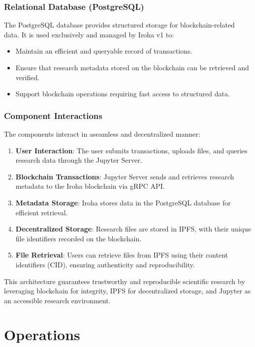 \documentclass[final]{rc-book-2.14}
\begin{document}
\subsubsection{Relational Database (PostgreSQL)}
The PostgreSQL database provides structured storage for blockchain-related data. It is used exclusively and managed by Iroha v1 to:
\begin{itemize}
    \item Maintain an efficient and queryable record of transactions.
    \item Ensure that research metadata stored on the blockchain can be retrieved and verified.
    \item Support blockchain operations requiring fast access to structured data.
\end{itemize}

\subsubsection{Component Interactions}
The components interact in aseamless and decentralized manner:
\begin{enumerate}
    \item \textbf{User Interaction}: The user submits transactions, uploads files, and queries research data through the Jupyter Server.
    \item \textbf{Blockchain Transactions}: Jupyter Server sends and retrieves research metadata to the Iroha blockchain via gRPC API.
    \item \textbf{Metadata Storage}: Iroha stores data in the PostgreSQL database for efficient retrieval.
    \item \textbf{Decentralized Storage}: Research files are stored in IPFS, with their unique file identifiers recorded on the blockchain.
    \item \textbf{File Retrieval}: Users can retrieve files from IPFS using their content identifiers (CID), ensuring authenticity and reproducibility.
\end{enumerate}

This architecture guarantees trustworthy and reproducible scientific research by leveraging blockchain for integrity, IPFS for decentralized storage, and Jupyter as an accessible research environment.


\section{Operations}
\label{chp:proposed_model:sec:operations}
\end{document}
